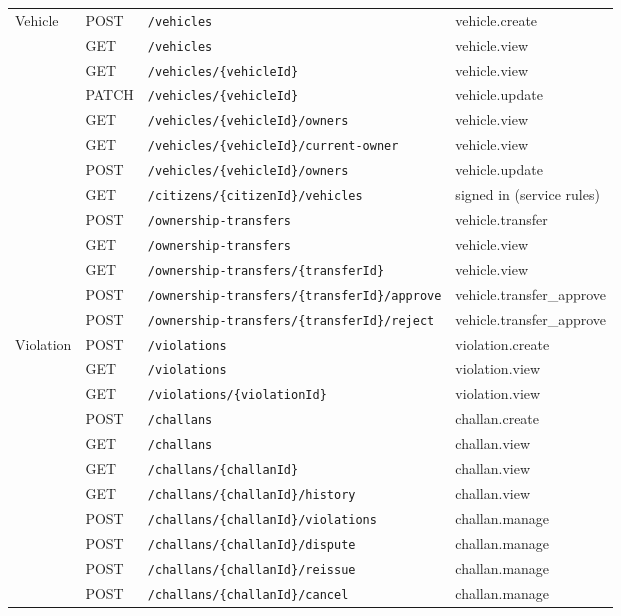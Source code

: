 \begin{longtable}{@{}p{2.1cm}l p{6.6cm} p{3.2cm}@{}}
Vehicle & POST & \texttt{/\allowbreak{}vehicles} & vehicle.create \\
 & GET & \texttt{/\allowbreak{}vehicles} & vehicle.view \\
 & GET & \texttt{/\allowbreak{}vehicles/\allowbreak{}\{vehicleId\}} & vehicle.view \\
 & PATCH & \texttt{/\allowbreak{}vehicles/\allowbreak{}\{vehicleId\}} & vehicle.update \\
 & GET & \texttt{/\allowbreak{}vehicles/\allowbreak{}\{vehicleId\}/\allowbreak{}owners} & vehicle.view \\
 & GET & \texttt{/\allowbreak{}vehicles/\allowbreak{}\{vehicleId\}/\allowbreak{}current-owner} & vehicle.view \\
 & POST & \texttt{/\allowbreak{}vehicles/\allowbreak{}\{vehicleId\}/\allowbreak{}owners} & vehicle.update \\
 & GET & \texttt{/\allowbreak{}citizens/\allowbreak{}\{citizenId\}/\allowbreak{}vehicles} & signed in (service rules) \\
 & POST & \texttt{/\allowbreak{}ownership-transfers} & vehicle.transfer \\
 & GET & \texttt{/\allowbreak{}ownership-transfers} & vehicle.view \\
 & GET & \texttt{/\allowbreak{}ownership-transfers/\allowbreak{}\{transferId\}} & vehicle.view \\
 & POST & \texttt{/\allowbreak{}ownership-transfers/\allowbreak{}\{transferId\}/\allowbreak{}approve} & vehicle.transfer\_\allowbreak{}approve \\
 & POST & \texttt{/\allowbreak{}ownership-transfers/\allowbreak{}\{transferId\}/\allowbreak{}reject} & vehicle.transfer\_\allowbreak{}approve \\
Violation & POST & \texttt{/\allowbreak{}violations} & violation.create \\
 & GET & \texttt{/\allowbreak{}violations} & violation.view \\
 & GET & \texttt{/\allowbreak{}violations/\allowbreak{}\{violationId\}} & violation.view \\
 & POST & \texttt{/\allowbreak{}challans} & challan.create \\
 & GET & \texttt{/\allowbreak{}challans} & challan.view \\
 & GET & \texttt{/\allowbreak{}challans/\allowbreak{}\{challanId\}} & challan.view \\
 & GET & \texttt{/\allowbreak{}challans/\allowbreak{}\{challanId\}/\allowbreak{}history} & challan.view \\
 & POST & \texttt{/\allowbreak{}challans/\allowbreak{}\{challanId\}/\allowbreak{}violations} & challan.manage \\
 & POST & \texttt{/\allowbreak{}challans/\allowbreak{}\{challanId\}/\allowbreak{}dispute} & challan.manage \\
 & POST & \texttt{/\allowbreak{}challans/\allowbreak{}\{challanId\}/\allowbreak{}reissue} & challan.manage \\
 & POST & \texttt{/\allowbreak{}challans/\allowbreak{}\{challanId\}/\allowbreak{}cancel} & challan.manage \\
\end{longtable}